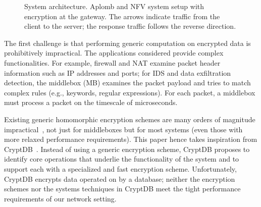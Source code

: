 \begin{figure}[t!]
\centering
\hspace{.2in}
%
\caption{System architecture. Aplomb and NFV system setup with \sys encryption  at the gateway. The arrows indicate traffic from the client to the server; the response traffic follows the reverse direction. \label{fig:sys-overview}}
\end{figure}


    
The first challenge is that performing generic computation on encrypted data is prohibitively impractical. The applications considered provide complex functionalities. For example, firewall and NAT examine packet header information such as IP addresses and ports; for IDS and data exfiltration detection, the middlebox (MB) examines the packet payload and tries to match complex rules (e.g., keywords, regular expressions). For each packet, a middlebox must process a packet on the timescale of microseconds. 

Existing generic homomorphic encryption schemes are many orders of magnitude impractical~\cite{gentry:fhe-aes-eprint}, not just for middleboxes but for most systems (even those with more relaxed performance requirements).
This paper hence takes inspiration from CryptDB~\cite{popa:cryptdb}. Instead of using a generic encryption scheme, CryptDB proposes to identify core operations that underlie the functionality of the system and to support each with a specialized and fast encryption scheme. 
Unfortunately, CryptDB encrypts data operated on by a database; neither the encryption schemes nor the systems techniques in CryptDB meet the tight performance requirements of our network setting.

